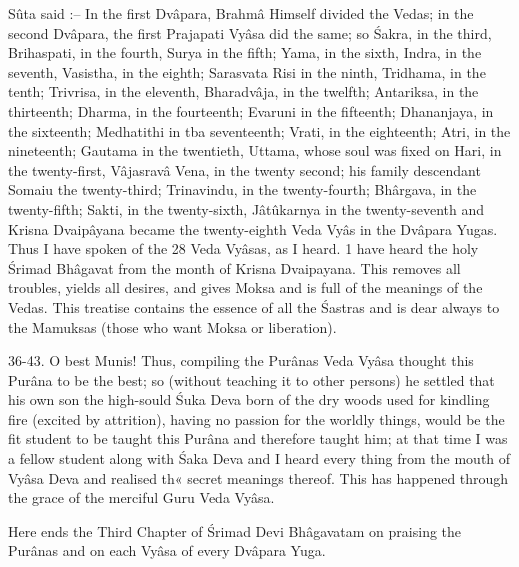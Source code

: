 S\^uta said :-- In the first Dv\^apara, Brahm\^a Himself divided the Vedas; in the second Dv\^apara, the first Prajapati Vy\^asa did the same; so \'Sakra, in the third, Brihaspati, in the fourth, Surya in the fifth; Yama, in the sixth, Indra, in the seventh, Vasistha, in the eighth; Sarasvata Risi in the ninth, Tridhama, in the tenth; Trivrisa, in the eleventh, Bharadv\^aja, in the twelfth; Antariksa, in the thirteenth; Dharma, in the fourteenth; Evaruni in the fifteenth; Dhananjaya, in the sixteenth; Medhatithi in tba seventeenth; Vrati, in the eighteenth; Atri, in the nineteenth; Gautama in the twentieth, Uttama, whose soul was fixed on Hari, in the twenty-first, V\^ajasrav\^a Vena, in the twenty second; his family descendant Somaiu the twenty-third; Trinavindu, in the twenty-fourth; Bh\^argava, in the twenty-fifth; Sakti, in the twenty-sixth, J\^at\^ukarnya in the twenty-seventh and Krisna Dvaip\^ayana became the twenty-eighth Veda Vy\^as in the Dv\^apara Yugas. Thus I have spoken of the 28 Veda Vy\^asas, as I heard. 1 have heard the holy \'Srimad Bh\^agavat from the month of Krisna Dvaipayana. This removes all troubles, yields all desires, and gives Moksa and is full of the meanings of the Vedas. This treatise contains the essence of all the \'Sastras and is dear always to the Mamuksas (those who want Moksa or liberation).

36-43. O best Munis! Thus, compiling the Pur\^anas Veda Vy\^asa thought this Pur\^ana to be the best; so (without teaching it to other persons) he settled that his own son the high-sould \'Suka Deva born of the dry woods used for kindling fire (excited by attrition), having no passion for the worldly things, would be the fit student to be taught this Pur\^ana and therefore taught him; at that time I was a fellow student along with \'Saka Deva and I heard every thing from the mouth of Vy\^asa Deva and realised th« secret meanings thereof. This has happened through the grace of the merciful Guru Veda Vy\^asa.

Here ends the Third Chapter of \'Srimad Devi Bh\^agavatam on praising the Pur\^anas and on each Vy\^asa of every Dv\^apara Yuga.